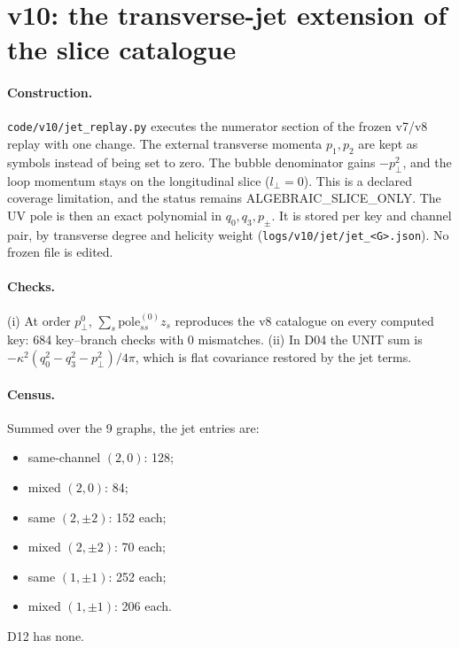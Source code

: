 \documentclass[11pt,a4paper]{article}
\newcommand{\loc}[1]{\nolinkurl{#1}}
\theoremstyle{plain}
\theoremstyle{definition}
\theoremstyle{remark}
\numberwithin{equation}{section}
\begin{document}
\section{v10: the transverse-jet extension of the slice catalogue}
\label{sec:v10jet}

\paragraph{Construction.}
\loc{code/v10/jet_replay.py} executes the numerator section of the
frozen v7/v8 replay with one change. The external transverse momenta
\(p_1,p_2\) are kept as symbols instead of being set to zero. The
bubble denominator gains \(-p_\perp^2\), and the loop momentum stays
on the longitudinal slice (\(l_\perp=0\)). This is a declared
coverage limitation, and the status remains
\textsf{ALGEBRAIC\_SLICE\_ONLY}. The UV pole is then an exact
polynomial in \(q_0,q_3,p_\pm\). It is stored per key and channel
pair, by transverse degree and helicity weight
(\loc{logs/v10/jet/jet_<G>.json}). No frozen file is edited.

\paragraph{Checks.}
(i) At order \(p_\perp^0\), \(\sum_s\mathrm{pole}^{(0)}_{ss}z_s\)
reproduces the v8 catalogue on every computed key: 684 key--branch
checks with 0 mismatches. (ii) In D04 the UNIT sum is
\(-\kappa^2(q_0^2-q_3^2-p_\perp^2)/4\pi\), which is flat
covariance restored by the jet terms.

\paragraph{Census.}
Summed over the 9 graphs, the jet entries are:
\begin{itemize}
\item same-channel \((2,0)\): 128;
\item mixed \((2,0)\): 84;
\item same \((2,\pm2)\): 152 each;
\item mixed \((2,\pm2)\): 70 each;
\item same \((1,\pm1)\): 252 each;
\item mixed \((1,\pm1)\): 206 each.
\end{itemize}
D12 has none.
\end{document}
